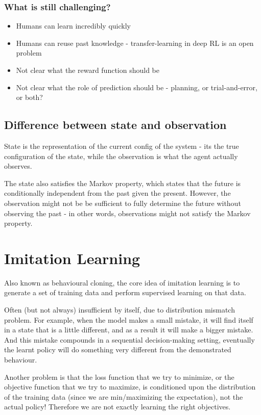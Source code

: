 \documentclass[11pt]{article} %
\begin{document}
\subsubsection{What is still challenging?}
\begin{itemize}
    \item Humans can learn incredibly quickly 
    \item Humans can reuse past knowledge - transfer-learning in deep RL is an open problem
    \item Not clear what the reward function should be
    \item Not clear what the role of prediction should be - planning, or trial-and-error, or both?
\end{itemize}

\subsection{Difference between state and observation}
State is the representation of the current config of the system - its the true configuration of the state,  while the observation is what the agent actually observes. 

The state also satisfies the Markov property, which states that the future is conditionally independent from the past given the present. However, the observation might not be be sufficient to fully determine the future without observing the past - in other words, observations might not satisfy the Markov property. 

\section{Imitation Learning}
Also known as behavioural cloning, the core idea of imitation learning is to generate a set of training data and perform supervised learning on that data.

Often (but not always) insufficient by itself, due to distribution mismatch problem. For example, when the model makes a small mistake, it will find itself in a state that is a little different, and as a result it will make a bigger mistake. And this mistake compounds in a sequential decision-making setting, eventually the learnt policy will do something very different from the demonstrated behaviour.

Another problem is that the loss function that we try to minimize, or the objective function that we try to maximize, is conditioned upon the distribution of the training data (since we are min/maximizing the expectation), not the actual policy! Therefore we are not exactly learning the right objectives.
\end{document}
